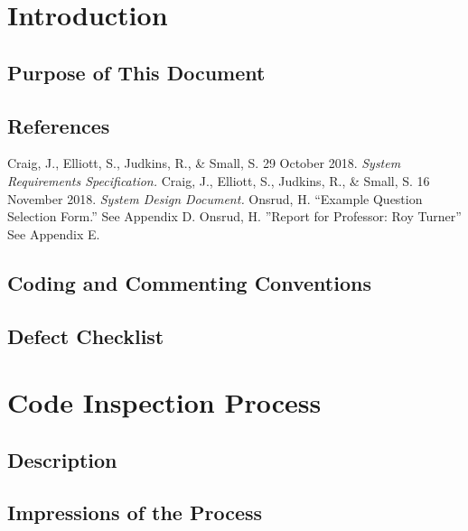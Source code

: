 \documentclass{article}
\begin{document}
\tableofcontents

\newpage

\section{Introduction}
 
\subsection{Purpose of This Document}



\subsection{References}

Craig, J., Elliott, S., Judkins, R., \& Small, S. 29 October 2018. \textit{System Requirements Specification.}
\vspace{3mm}\newline
Craig, J., Elliott, S., Judkins, R., \& Small, S. 16 November 2018. \textit{System Design Document.}
\vspace{3mm}\newline
Onsrud, H. ``Example Question Selection Form.'' See Appendix D.
\vspace{3mm}\newline
Onsrud, H. ''Report for Professor: Roy Turner'' See Appendix E.

\subsection{Coding and Commenting Conventions}



\subsection{Defect Checklist}



\section{Code Inspection Process}

\subsection{Description}



\subsection{Impressions of the Process}
\end{document}
